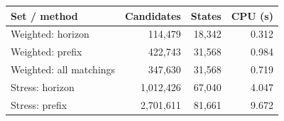 \begin{tabular}{lrrr}
\toprule Set / method & Candidates & States & CPU (s) \\
\midrule
Weighted: horizon & 114,479 & 18,342 & 0.312 \\
Weighted: prefix & 422,743 & 31,568 & 0.984 \\
Weighted: all matchings & 347,630 & 31,568 & 0.719 \\
\midrule
Stress: horizon & 1,012,426 & 67,040 & 4.047 \\
Stress: prefix & 2,701,611 & 81,661 & 9.672 \\
\bottomrule
\end{tabular}
